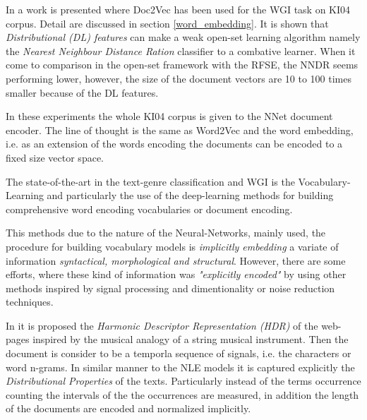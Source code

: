 In \parencite{pritsos2019open} a work is presented where Doc2Vec has been used for the WGI task on KI04 corpus. Detail are discussed in section \ref{word_embedding}. It is shown that \textit{Distributional (DL) features} can make a weak open-set learning algorithm namely the \textit{Nearest Neighbour Distance Ration} classifier to a combative learner. When it come to comparison in the open-set framework with the RFSE, the NNDR seems performing lower, however, the size of the document vectors are 10 to 100 times smaller because of the DL features. 

In these experiments the whole KI04 corpus is given to the NNet document encoder. The line of thought is the same as Word2Vec and the word embedding, i.e. as an extension of the words encoding the documents can be encoded to a fixed size vector space. 




The state-of-the-art in the text-genre classification and WGI is the Vocabulary-Learning and particularly the use of the deep-learning methods for building comprehensive word encoding vocabularies or document encoding. 

This methods due to the nature of the Neural-Networks, mainly used,  the procedure for building vocabulary models is \textit{implicitly embedding} a variate of information\textit{ syntactical, morphological and structural}. However, there are some efforts, where these kind of information was \textit{"explicitly encoded"} by using other methods inspired by signal processing and dimentionality or noise reduction techniques.


In \parencite{kim2010formulating} it is proposed the \textit{Harmonic Descriptor Representation (HDR)} of the web-pages inspired by the musical analogy of a string musical instrument. Then the document is consider to be a temporla sequence of signals, i.e. the characters or word n-grams. In similar manner to the NLE models it is captured explicitly the \textit{Distributional Properties} of the texts. Particularly instead of the terms occurrence counting the intervals of the the occurrences are measured, in addition the length of the documents are encoded and normalized implicitly. 

